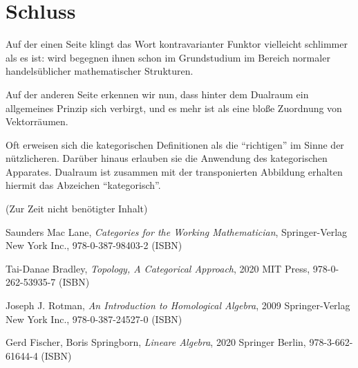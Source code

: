 \documentclass[a4paper]{amsart}
\theoremstyle{definition}
\begin{document}
\section{Schluss}
Auf der einen Seite klingt das Wort kontravarianter Funktor vielleicht schlimmer als es ist: wird begegnen ihnen schon im Grundstudium im Bereich normaler handelsüblicher mathematischer Strukturen.

Auf der anderen Seite erkennen wir nun, dass hinter dem Dualraum ein allgemeines Prinzip sich verbirgt, und es mehr ist als eine bloße Zuordnung von Vektorräumen.

Oft erweisen sich die kategorischen Definitionen als die "`richtigen"' im Sinne der nützlicheren. Darüber hinaus erlauben sie die Anwendung des kategorischen Apparates. Dualraum ist zusammen mit der transponierten Abbildung erhalten hiermit das Abzeichen "`kategorisch"'.


\begin{backup}
    (Zur Zeit nicht benötigter Inhalt)
\end{backup}

\begin{thebibliography}{9}

      Saunders Mac Lane, \emph{Categories for the Working Mathematician},
      Springer-Verlag New York Inc., 978-0-387-98403-2 (ISBN)
      
      Tai-Danae Bradley, \emph{Topology, A Categorical Approach},
      2020 MIT Press, 978-0-262-53935-7 (ISBN)

   	Joseph J. Rotman, \emph{An Introduction to Homological Algebra},
   	2009 Springer-Verlag New York Inc., 978-0-387-24527-0 (ISBN)
      
     Gerd Fischer, Boris Springborn, \emph{Lineare Algebra},
     2020 Springer Berlin, 978-3-662-61644-4 (ISBN)

\end{thebibliography}
\end{document}

